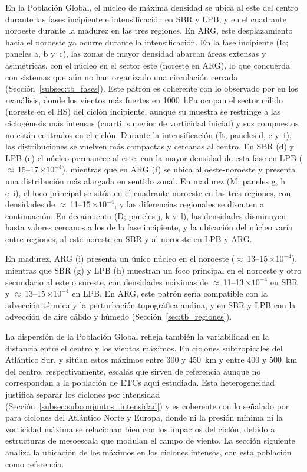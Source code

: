 En la Población Global, el núcleo de máxima densidad se ubica al este del centro durante las fases incipiente e intensificación en SBR y LPB, y en el cuadrante noroeste durante la madurez en las tres regiones. En ARG, este desplazamiento hacia el noroeste ya ocurre durante la intensificación.
En la fase incipiente (Ic; paneles a, b y~c), las zonas de mayor densidad abarcan áreas extensas y asimétricas, con el núcleo en el sector este (noreste en ARG), lo que concuerda con sistemas que aún no han organizado una circulación cerrada (Sección~\ref{subsec:tb_fases}).
Este patrón es coherente con lo observado por \citet{dejesus2021multimodel} en los reanálisis, donde los vientos más fuertes en 1000~hPa ocupan el sector cálido (noreste en el HS) del ciclón incipiente, aunque su muestra se restringe a las ciclogénesis más intensas (cuartil superior de vorticidad inicial) y sus compuestos no están centrados en el ciclón.
Durante la intensificación (It; paneles d, e y~f), las distribuciones se vuelven más compactas y cercanas al centro. En SBR (d) y LPB (e) el núcleo permanece al este, con la mayor densidad de esta fase en LPB (${\approx}$\,15--17\,$\times10^{-4}$), mientras que en ARG (f) se ubica al oeste-noroeste y presenta una distribución más alargada en sentido zonal.
En madurez (M; paneles g, h e~i), el foco principal se sitúa en el cuadrante noroeste en las tres regiones, con densidades de ${\approx}$\,11--15\,$\times10^{-4}$, y las diferencias regionales se discuten a continuación.
En decaimiento (D; paneles j, k y~l), las densidades disminuyen hasta valores cercanos a los de la fase incipiente, y la ubicación del núcleo varía entre regiones, al este-noreste en SBR y al noroeste en LPB y ARG.

En madurez, ARG (i) presenta un único núcleo en el noroeste (${\approx}$\,13--15\,$\times10^{-4}$), mientras que SBR (g) y LPB (h) muestran un foco principal en el noroeste y otro secundario al este o sureste, con densidades máximas de ${\approx}$\,11--13\,$\times10^{-4}$ en SBR y ${\approx}$\,13--15\,$\times10^{-4}$ en LPB. 
En ARG, este patrón sería compatible con la advección térmica y la perturbación topográfica andina, y en SBR y LPB con la advección de aire cálido y húmedo (Sección~\ref{sec:tb_regiones}).

La dispersión de la Población Global refleja también la variabilidad en la distancia entre el centro y los vientos máximos. En ciclones subtropicales del Atlántico Sur, \citet{gozzo2014subtropical} y \citet{cardoso2020wind} sitúan estos máximos entre 300 y 450~km y entre 400 y 500~km del centro, respectivamente, escalas que sirven de referencia aunque no correspondan a la población de ETCs aquí estudiada. Esta heterogeneidad justifica separar los ciclones por intensidad (Sección~\ref{subsec:subconjuntos_intensidad}) y es coherente con lo señalado por \citet{corner2025classification} para ciclones del Atlántico Norte y Europa, donde ni la presión mínima ni la vorticidad máxima se relacionan bien con los impactos del ciclón, debido a estructuras de mesoescala que modulan el campo de viento. La sección siguiente analiza la ubicación de los máximos en los ciclones intensos, con esta población como referencia.

